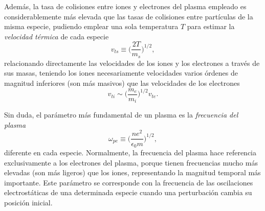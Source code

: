 Además, la tasa de colisiones entre iones y electrones del plasma empleado es considerablemente más elevada que las tasas de colisiones entre partículas de la misma especie, pudiendo emplear una sola temperatura $T$ para estimar la \emph{velocidad térmica} de cada especie 
\begin{equation}\label{eq:1.47}
  v_{ts} \equiv \bigg(\frac{2T}{m_{s}}\bigg)^{1/2},
\end{equation}
relacionando directamente las velocidades de los iones y los electrones a través de sus masas, teniendo los iones necesariamente velocidades varios órdenes de magnitud inferiores (son más masivos) que las velocidades de los electrones
\begin{equation}\label{eq:1.48}
  v_{ti} \sim \bigg(\frac{m_{e}}{m_{i}}\bigg)^{1/2}v_{te}.
\end{equation}

Sin duda, el parámetro más fundamental de un plasma es la \emph{frecuencia del plasma}\autocite{Thorne2017} 
\begin{equation}\label{eq:1.49}
  \omega_{pe} \equiv \bigg(\frac{ne^{2}}{\epsilon_{0}m}\bigg)^{1/2},
\end{equation}
diferente en cada especie. Normalmente, la frecuencia del plasma hace referencia exclusivamente a los electrones del plasma, porque tienen frecuencias mucho más elevadas (son más ligeros) que los iones, representando la magnitud temporal más importante. Este parámetro se corresponde con la frecuencia de las oscilaciones electrostáticas de una determinada especie cuando una perturbación cambia su posición inicial. 

